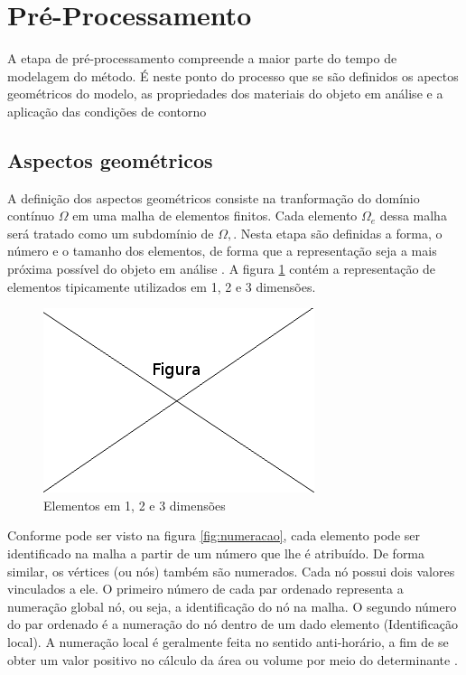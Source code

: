 \documentclass[
    12pt,               %
    openright,          %
    oneside,
    a4paper,            %
    english,            %
    french,             %
    spanish,            %
    brazil              %
    ]{abntex2}
\begin{document}
\section{Pré-Processamento}

A etapa de pré-processamento compreende a maior parte do tempo de modelagem do método. É neste ponto do processo que se são definidos os apectos geométricos do modelo, as propriedades dos materiais do objeto em análise e a aplicação das condições de contorno \cite[p. 9, 665]{zien}

\subsection{Aspectos geométricos} 
A definição dos aspectos geométricos consiste na tranformação do domínio contínuo $\Omega$ em uma malha de elementos finitos. Cada elemento $\Omega_e$ dessa malha será tratado como um subdomínio de $\Omega,$.  
Nesta etapa são definidas a forma, o número e o tamanho dos elementos, de forma que a representação seja a mais próxima possível do objeto em análise \cite[p. 154]{desai}.
A figura \ref{fig:elementos} contém a representação de elementos tipicamente utilizados em 1, 2 e 3 dimensões. 

\begin{figure}[!htb]
\centering
\includegraphics[scale=0.5]{figuras/temp.png}
\caption{Elementos em 1, 2 e 3 dimensões}
\label{fig:elementos}
\end{figure}

Conforme pode ser visto na figura \ref{fig:numeracao}, cada elemento pode ser identificado na malha a partir de um número que lhe é atribuído. De forma similar, os vértices (ou nós) também são numerados. Cada nó possui dois valores vinculados a ele. 
O primeiro número de cada par ordenado representa a numeração global nó, ou seja, a identificação do nó na malha. O segundo número do par ordenado é a numeração do nó dentro de um dado elemento (Identificação local). A numeração local é geralmente feita no sentido anti-horário, a fim de se obter um valor positivo no cálculo da área ou volume por meio do  determinante \cite[p. 394]{sadiku}. 
\end{document}
